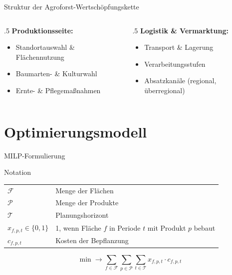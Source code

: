 \documentclass[10pt,aspectratio=169]{beamer}
\newcommand{\Fc}{\mathcal{F}}
\newcommand{\Pc}{\mathcal{P}}
\newcommand{\Tcc}{\mathcal{T}}
\begin{document}
\begin{frame}{Struktur der Agroforst-Wertsch\"opfungskette}
  \begin{columns}[T]
    \begin{column}{.5\textwidth}
      \textbf{Produktionsseite:}
      \begin{itemize}
        \item Standortauswahl \& Fl\"achennutzung
        \item Baumarten- \& Kulturwahl
        \item Ernte- \& Pflegema\ss{}nahmen
      \end{itemize}
    \end{column}
    \begin{column}{.5\textwidth}
      \textbf{Logistik \& Vermarktung:}
      \begin{itemize}
        \item Transport \& Lagerung
        \item Verarbeitungsstufen
        \item Absatzkan\"ale (regional, \"uberregional)
      \end{itemize}
    \end{column}
  \end{columns}
\end{frame}


\section{Optimierungsmodell}

\begin{frame}{MILP-Formulierung}
  \begin{block}{Notation}
    \begin{tabularx}{.99\textwidth}{l @{\hskip1ex} X}
      $\Fc$ & Menge der Fl\"achen \\
      $\Pc$ & Menge der Produkte \\
      $\Tcc$ & Planungshorizont \\
      $x_{f,p,t} \in \{0,1\}$ & 1, wenn Fl\"ache $f$ in Periode $t$ mit Produkt $p$ bebaut \\
      $c_{f,p,t}$ & Kosten der Bepflanzung \\
    \end{tabularx}
  \end{block}
  \vspace{2ex}
  \begin{equation*}
    \min \rightarrow \sum_{f \in \Fc} \sum_{p \in \Pc} \sum_{t \in \Tcc} x_{f,p,t} \cdot c_{f,p,t}
  \end{equation*}
\end{frame}
\end{document}
